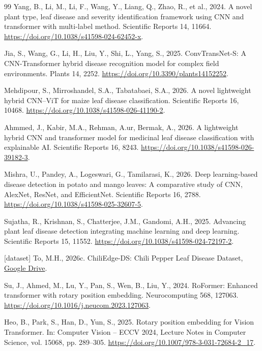 \begin{thebibliography}{99}
Yang, B., Li, M., Li, F., Wang, Y., Liang, Q., Zhao, R., et al., 2024. A novel plant type, leaf disease and severity identification framework using CNN and transformer with multi-label method. Scientific Reports 14, 11664. \url{https://doi.org/10.1038/s41598-024-62452-x}.

Jia, S., Wang, G., Li, H., Liu, Y., Shi, L., Yang, S., 2025. ConvTransNet-S: A CNN-Transformer hybrid disease recognition model for complex field environments. Plants 14, 2252. \url{https://doi.org/10.3390/plants14152252}.

Mehdipour, S., Mirroshandel, S.A., Tabatabaei, S.A., 2026. A novel lightweight hybrid CNN--ViT for maize leaf disease classification. Scientific Reports 16, 10468. \url{https://doi.org/10.1038/s41598-026-41190-2}.

Ahmmed, J., Kabir, M.A., Rehman, A.ur, Bermak, A., 2026. A lightweight hybrid CNN and transformer model for medicinal leaf disease classification with explainable AI. Scientific Reports 16, 8243. \url{https://doi.org/10.1038/s41598-026-39182-3}.

Mishra, U., Pandey, A., Logeswari, G., Tamilarasi, K., 2026. Deep learning-based disease detection in potato and mango leaves: A comparative study of CNN, AlexNet, ResNet, and EfficientNet. Scientific Reports 16, 2788. \url{https://doi.org/10.1038/s41598-025-32607-5}.

Sujatha, R., Krishnan, S., Chatterjee, J.M., Gandomi, A.H., 2025. Advancing plant leaf disease detection integrating machine learning and deep learning. Scientific Reports 15, 11552. \url{https://doi.org/10.1038/s41598-024-72197-2}.

{[}dataset{]} To, M.H., 2026c. ChiliEdge-DS: Chili Pepper Leaf Disease Dataset, \href{https://drive.google.com/drive/folders/1DesS0c5xT6J72tIv8AMZLwC8ANFUk2PC?usp=drive_link}{Google Drive}.

Su, J., Ahmed, M., Lu, Y., Pan, S., Wen, B., Liu, Y., 2024. RoFormer: Enhanced transformer with rotary position embedding. Neurocomputing 568, 127063. \url{https://doi.org/10.1016/j.neucom.2023.127063}.

Heo, B., Park, S., Han, D., Yun, S., 2025. Rotary position embedding for Vision Transformer. In: Computer Vision -- ECCV 2024, Lecture Notes in Computer Science, vol. 15068, pp. 289--305. \url{https://doi.org/10.1007/978-3-031-72684-2_17}.


\end{thebibliography}

